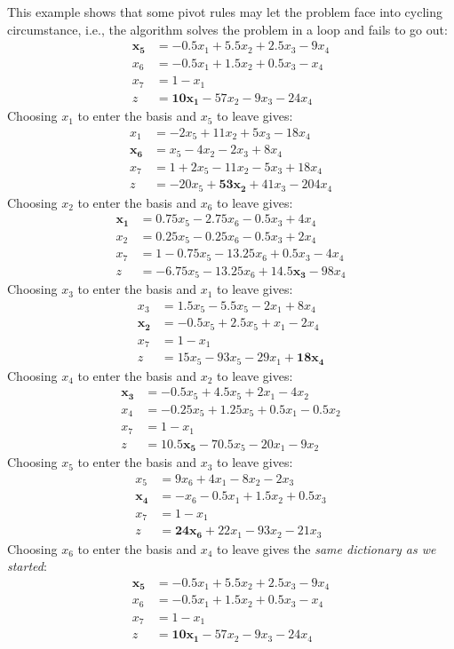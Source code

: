 \begin{example}
This example shows that some pivot rules may let the problem face into cycling circumstance, i.e., the algorithm solves the problem in a loop and fails to go out:
\begin{align*}
\bm{x_5}&=-0.5x_1+5.5x_2+2.5x_3-9x_4\\
x_6&=-0.5x_1+1.5x_2+0.5x_3-x_4\\
x_7&=1-x_1\\
z&=\bm{10x_1}-57x_2-9x_3-24x_4
\end{align*}
Choosing $x_1$ to enter the basis and $x_5$ to leave gives:
\begin{align*}
x_1&=-2x_5+11x_2+5x_3-18x_4\\
\bm{x_6}&=x_5-4x_2-2x_3+8x_4\\
x_7&=1+2x_5-11x_2-5x_3+18x_4\\
z&=-20x_5+\bm{53x_2}+41x_3-204x_4
\end{align*}
Choosing $x_2$ to enter the basis and $x_6$ to leave gives:
\begin{align*}
\bm{x_1}&=0.75x_5-2.75x_6-0.5x_3+4x_4\\
x_2&=0.25x_5-0.25x_6-0.5x_3+2x_4\\
x_7&=1-0.75x_5-13.25x_6+0.5x_3-4x_4\\
z&=-6.75x_5-13.25x_6+\bm{14.5x_3}-98x_4
\end{align*}
Choosing $x_3$ to enter the basis and $x_1$ to leave gives:
\begin{align*}
x_3&=1.5x_5-5.5x_5-2x_1+8x_4\\
\bm{x_2}&=-0.5x_5+2.5x_5+x_1-2x_4\\
x_7&=1-x_1\\
z&=15x_5-93x_5-29x_1+\bm{18x_4}
\end{align*}
Choosing $x_4$ to enter the basis and $x_2$ to leave gives:
\begin{align*}
\bm{x_3}&=-0.5x_5+4.5x_5+2x_1-4x_2\\
x_4&=-0.25x_5+1.25x_5+0.5x_1-0.5x_2\\
x_7&=1-x_1\\
z&=\bm{10.5x_5}-70.5x_5-20x_1-9x_2
\end{align*}
Choosing $x_5$ to enter the basis and $x_3$ to leave gives:
\begin{align*}
x_5&=9x_6+4x_1-8x_2-2x_3\\
\bm{x_4}&=-x_6-0.5x_1+1.5x_2+0.5x_3\\
x_7&=1-x_1\\
z&=\bm{24x_6}+22x_1-93x_2-21x_3
\end{align*}
Choosing $x_6$ to enter the basis and $x_4$ to leave gives the \emph{same dictionary as we started}:
\begin{align*}
\bm{x_5}&=-0.5x_1+5.5x_2+2.5x_3-9x_4\\
x_6&=-0.5x_1+1.5x_2+0.5x_3-x_4\\
x_7&=1-x_1\\
z&=\bm{10x_1}-57x_2-9x_3-24x_4
\end{align*}
\end{example}

